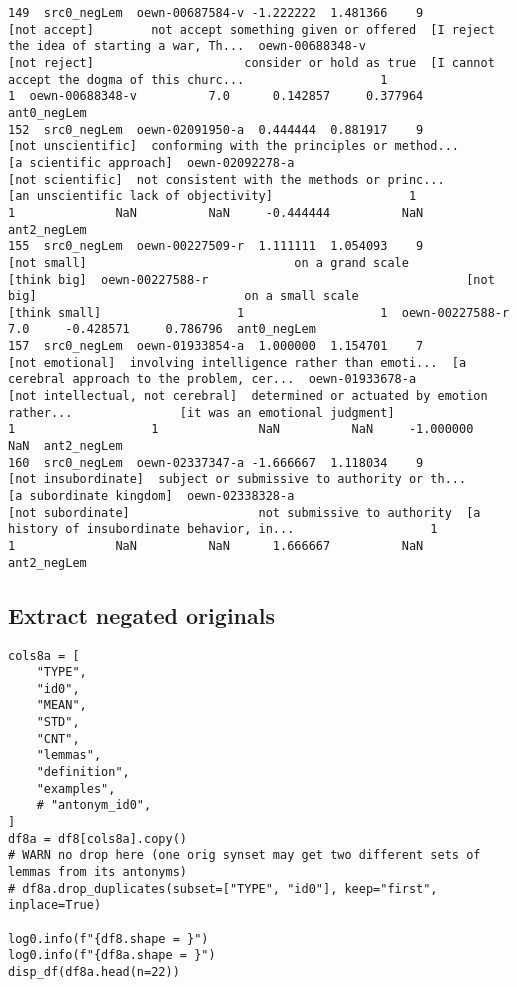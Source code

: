 \documentclass[a4paper,10pt,onecolumn,oneside,openright]{article}
\begin{document}
\begin{verbatim}
149  src0_negLem  oewn-00687584-v -1.222222  1.481366    9                                 [not accept]        not accept something given or offered  [I reject the idea of starting a war, Th...  oewn-00688348-v                                 [not reject]                     consider or hold as true  [I cannot accept the dogma of this churc...                   1                   1  oewn-00688348-v          7.0      0.142857     0.377964  ant0_negLem
152  src0_negLem  oewn-02091950-a  0.444444  0.881917    9                           [not unscientific]  conforming with the principles or method...                      [a scientific approach]  oewn-02092278-a                             [not scientific]  not consistent with the methods or princ...        [an unscientific lack of objectivity]                   1                   1              NaN          NaN     -0.444444          NaN  ant2_negLem
155  src0_negLem  oewn-00227509-r  1.111111  1.054093    9                                  [not small]                             on a grand scale                                  [think big]  oewn-00227588-r                                    [not big]                             on a small scale                                [think small]                   1                   1  oewn-00227588-r          7.0     -0.428571     0.786796  ant0_negLem
157  src0_negLem  oewn-01933854-a  1.000000  1.154701    7                              [not emotional]  involving intelligence rather than emoti...  [a cerebral approach to the problem, cer...  oewn-01933678-a             [not intellectual, not cerebral]  determined or actuated by emotion rather...               [it was an emotional judgment]                   1                   1              NaN          NaN     -1.000000          NaN  ant2_negLem
160  src0_negLem  oewn-02337347-a -1.666667  1.118034    9                          [not insubordinate]  subject or submissive to authority or th...                      [a subordinate kingdom]  oewn-02338328-a                            [not subordinate]                  not submissive to authority  [a history of insubordinate behavior, in...                   1                   1              NaN          NaN      1.666667          NaN  ant2_negLem
\end{verbatim}

\subsection{Extract negated originals}
\label{sec:org9f44c51}
\begin{verbatim}
cols8a = [
    "TYPE",
    "id0",
    "MEAN",
    "STD",
    "CNT",
    "lemmas",
    "definition",
    "examples",
    # "antonym_id0",
]
df8a = df8[cols8a].copy()
# WARN no drop here (one orig synset may get two different sets of lemmas from its antonyms)
# df8a.drop_duplicates(subset=["TYPE", "id0"], keep="first", inplace=True)

log0.info(f"{df8.shape = }")
log0.info(f"{df8a.shape = }")
disp_df(df8a.head(n=22))
\end{verbatim}
\end{document}
